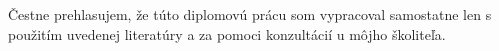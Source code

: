 Čestne prehlasujem, že túto diplomovú prácu som
vypracoval samostatne len s použitím uvedenej literatúry
a za pomoci konzultácií u môjho školiteľa.